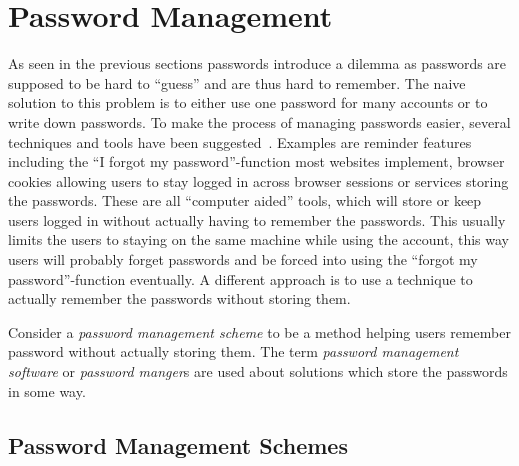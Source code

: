 \section{Password Management}
As seen in the previous sections passwords introduce a dilemma as passwords are supposed to be hard to ``guess'' and are thus hard to remember. The naive solution to this problem is to either use one password for many accounts or to write down passwords. To make the process of managing passwords easier, several techniques and tools have been suggested~\cite{management-strategies}. Examples are reminder features including the ``I forgot my password''-function most websites implement, browser cookies allowing users to stay logged in across browser sessions or services storing the passwords. These are all ``computer aided'' tools, which will store or keep users logged in without actually having to remember the passwords. This usually limits the users to staying on the same machine while using the account, this way users will probably forget passwords and be forced into using the ``forgot my password''-function eventually. A different approach is to use a technique to actually remember the passwords without storing them.
\par Consider a \emph{password management scheme} to be a method helping users remember password without actually storing them. The term \emph{password management software} or \emph{password manger}s are used about solutions which store the passwords in some way.

\subsection{Password Management Schemes}
 
